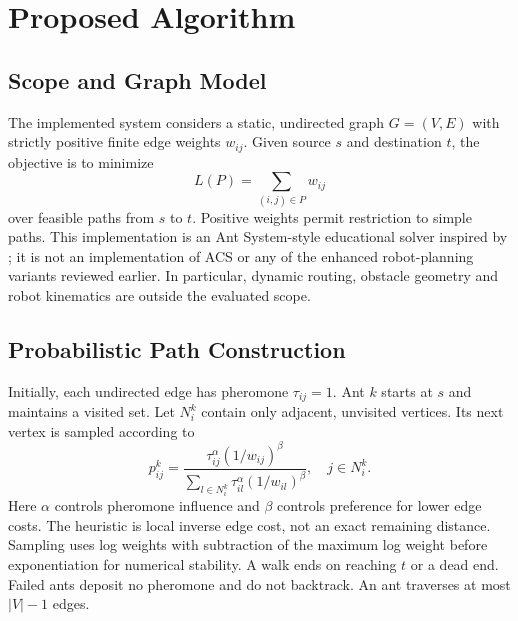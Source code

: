\documentclass[conference]{IEEEtran}
\begin{document}
\section{Proposed Algorithm}
\subsection{Scope and Graph Model}
The implemented system considers a static, undirected graph $G=(V,E)$ with strictly positive finite edge weights $w_{ij}$. Given source $s$ and destination $t$, the objective is to minimize
\begin{equation}
L(P)=\sum_{(i,j)\in P} w_{ij}
\end{equation}
over feasible paths from $s$ to $t$. Positive weights permit restriction to simple paths. This implementation is an Ant System-style educational solver inspired by \cite{dorigo1996}; it is not an implementation of ACS or any of the enhanced robot-planning variants reviewed earlier. In particular, dynamic routing, obstacle geometry and robot kinematics are outside the evaluated scope.

\subsection{Probabilistic Path Construction}
Initially, each undirected edge has pheromone $\tau_{ij}=1$. Ant $k$ starts at $s$ and maintains a visited set. Let $N_i^k$ contain only adjacent, unvisited vertices. Its next vertex is sampled according to
\begin{equation}
p_{ij}^{k}=\frac{\tau_{ij}^{\alpha}(1/w_{ij})^{\beta}}
{\sum_{l\in N_i^k}\tau_{il}^{\alpha}(1/w_{il})^{\beta}},\quad j\in N_i^k.
\end{equation}
Here $\alpha$ controls pheromone influence and $\beta$ controls preference for lower edge costs. The heuristic is local inverse edge cost, not an exact remaining distance. Sampling uses log weights with subtraction of the maximum log weight before exponentiation for numerical stability. A walk ends on reaching $t$ or a dead end. Failed ants deposit no pheromone and do not backtrack. An ant traverses at most $|V|-1$ edges.
\end{document}
